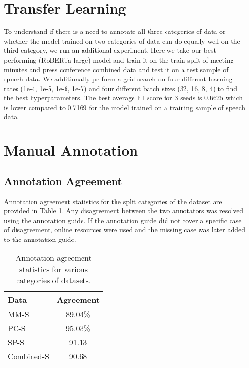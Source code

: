 \documentclass[11pt]{article}
\begin{document}
\section{Transfer Learning}
\label{ap:transfer_learning}
To understand if there is a need to annotate all three categories of data or whether the model trained on two categories of data can do equally well on the third category, we run an additional experiment. Here we take our best-performing (RoBERTa-large) model and train it on the train split of meeting minutes and press conference combined data and test it on a test sample of speech data. We additionally perform a grid search on four different learning rates (1e-4, 1e-5, 1e-6, 1e-7) and four different batch sizes (32, 16, 8, 4) to find the best hyperparameters. The best average F1 score for 3 seeds is 0.6625 which is lower compared to 0.7169 for the model trained on a training sample of speech data. 

\section{Manual Annotation}
\subsection{Annotation Agreement}
\label{sec:agreement_ann}
Annotation agreement statistics for the split categories of the dataset are provided in Table \ref{tb:annotation_agreement}. Any disagreement between the two annotators was resolved using the annotation guide. If the annotation guide did not cover a specific case of disagreement, online resources were used and the missing case was later added to the annotation guide. 

\begin{table}
\centering
\footnotesize
\begin{tabular}{lc}
\hline
\textbf{Data} & \textbf{Agreement} \\
\hline
MM-S & 89.04\% \\
PC-S & 95.03\% \\
SP-S & 91.13 \\
Combined-S & 90.68 \\
\hline
\end{tabular}
\caption{Annotation agreement statistics for various categories of datasets. }
\label{tb:annotation_agreement}
\end{table}
\end{document}
